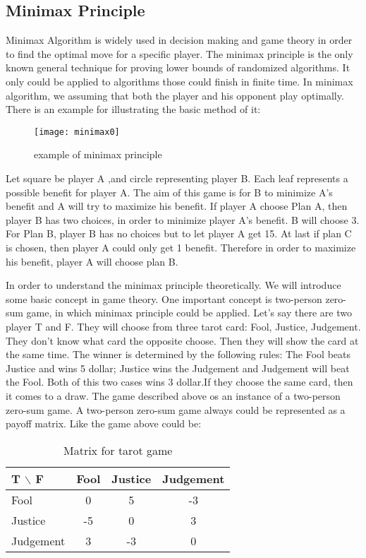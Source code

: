 \subsection{Minimax Principle}
Minimax Algorithm is widely used in decision making and game theory in order to find the optimal move for a specific player. The minimax principle is the only known general technique for proving lower bounds of randomized algorithms. It only could be applied to algorithms those could finish in finite time. In minimax algorithm, we assuming that both the player and his opponent play optimally. There is an example for illustrating the basic method of it:

\begin{figure}[H]
	\centering
	\texttt{[image: minimax0]}
	\caption{example of minimax principle}
	\label{fig:minimax0}
\end{figure}
Let square be player A ,and circle representing player B. Each leaf represents a possible benefit for player A. The aim of this game is for B to minimize A's benefit and A will try to maximize his benefit. If player A choose Plan A, then player B has two choices, in order to minimize player A's benefit. B will choose 3. For Plan B, player B has no choices but to let player A get 15. At last if plan C is chosen, then  player A could only get 1 benefit. Therefore in order to maximize his benefit, player A will choose plan B.

In order to understand the minimax principle theoretically. We will introduce some basic concept in game theory. One important concept is two-person zero-sum game, in which minimax principle could be applied. Let's say there are two player T and F. They will choose from three tarot card: Fool, Justice, Judgement. They don't know what card the opposite choose. Then they will show the card at the same time. The winner is determined by the following rules: The Fool beats Justice and wins 5 dollar; Justice wins the Judgement and Judgement will beat the Fool. Both of this two cases wins 3 dollar.If they choose the same card, then it comes to a draw. The game described above os an instance of a two-person zero-sum game. A two-person zero-sum game always could be represented as a payoff matrix. Like the game above could be:
\begin{table}[H]
	\caption{Matrix for tarot game}
	\begin{tabular}{lccc}
		\hline
		\hline
		  T $\backslash$ F & Fool & Justice & Judgement \\
		  \hline
		  \hline
		  Fool & 0 & 5 & -3\\
		  \hline
		  Justice & -5 & 0 & 3\\
		  \hline
		  Judgement & 3 & -3 & 0\\
		 \hline
		 \hline
	\end{tabular}
\end{table}

